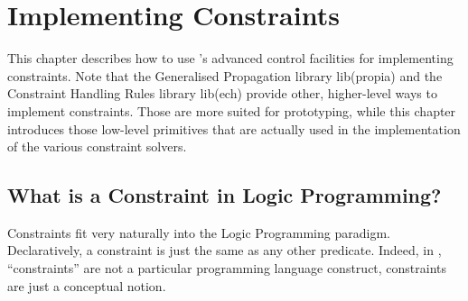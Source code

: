 %
% 
% 
% 
% 

\chapter{Implementing Constraints}
\label{chapimpl}

This chapter describes how to use \eclipse{}'s advanced control
facilities for implementing constraints.
Note that the Generalised Propagation library lib(propia) and
the Constraint Handling Rules library lib(ech) provide other,
higher-level ways to implement constraints. Those are more
suited for prototyping, while this chapter introduces those low-level
primitives that are actually used in the implementation of the various
\eclipse{} constraint solvers.


\section{What is a Constraint in Logic Programming?}

Constraints fit very naturally into the Logic Programming paradigm.
Declaratively, a constraint is just the same as any other predicate.
Indeed, in \eclipse{}, ``constraints'' are not a particular
programming language construct, constraints are just a conceptual notion.

